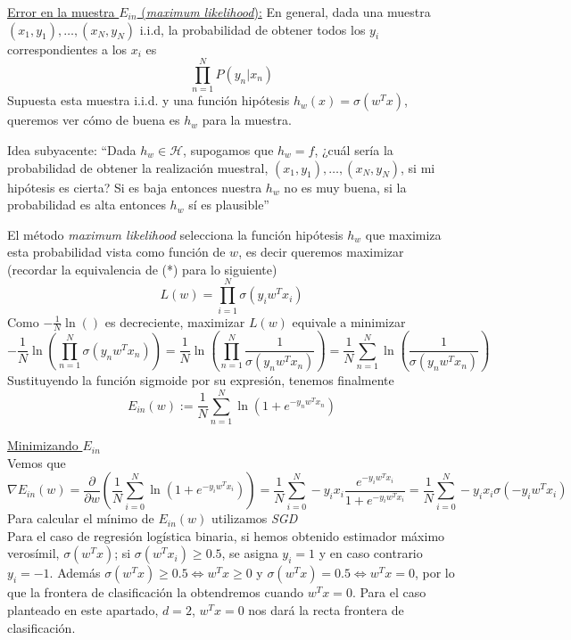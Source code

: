 \documentclass[11pt,a4paper]{article}
\theoremstyle{definition}
\begin{document}
	\underline{Error en la muestra $E_{in}$ (\textit{maximum likelihood}):} En general, dada una muestra $(x_1,y_1),\ldots,(x_N, y_N)$ i.i.d, la probabilidad de obtener todos los $y_i$ correspondientes a los $x_i$ es
		$$\prod_{n=1}^N P(y_n | x_n)$$ 
		Supuesta esta muestra i.i.d. y una función hipótesis $h_w(x)=\sigma(w^Tx)$, queremos ver cómo de buena es $h_w$ para la muestra.
		
		Idea subyacente: ``Dada $h_w \in \mathcal H$, supogamos que $h_w=f$, ¿cuál sería la probabilidad de obtener la realización muestral, $(x_1,y_1),\ldots,(x_N, y_N)$, si mi hipótesis es cierta? Si es baja entonces nuestra $h_w$ no es muy buena, si la probabilidad es alta entonces $h_w$ sí es plausible''
		
		El método \textit{maximum likelihood} selecciona la función hipótesis $h_w$ que maximiza esta probabilidad vista como función de $w$, es decir queremos maximizar (recordar la equivalencia de (*) para lo siguiente)
	$$L(w)\iffalse=\prod_{i=1}^N P(y_i|x_i)\fi=\prod_{i=1}^N \sigma (y_i w^T x_i) $$
	Como $-\frac{1}{N} \ln()$ es decreciente, maximizar $L(w)$ equivale a minimizar 
		$$-\frac{1}{N} \ln\left( \prod_{n=1}^N \sigma(y_n w^T x_n)\right)=\frac{1}{N} \ln\left( \prod_{n=1}^N \frac{1}{\sigma(y_n w^T x_n)}\right)=\frac{1}{N}  \sum_{n=1}^N \ln \left( \frac{1}{\sigma(y_n w^T x_n)} \right)$$
		Sustituyendo la función sigmoide por su expresión, tenemos finalmente
		$$E_{in}(w):=\frac{1}{N} \sum_{n=1}^N \ln \left(1+e^{-y_nw^Tx_n}\right)$$
		
	\underline{Minimizando $E_{in}$}\\
	Vemos que 
	$$\nabla E_{in}(w)=\frac{\partial}{\partial w} \left( \frac{1}{N} \sum_{i=0}^N \ln (1+e^{-y_i w^T x_i})\right)=\frac{1}{N}\sum_{i=0}^N -y_ix_i \frac{e^{-y_i w^T x_i}}{1+e^{-y_iw^Tx_i}}=\frac{1}{N}\sum_{i=0}^N -y_ix_i\sigma(-y_iw^Tx_i)$$
	Para calcular el mínimo de $E_{in}(w)$ utilizamos \textit{SGD}\\
	
	Para el caso de regresión logística binaria, si hemos obtenido estimador máximo verosímil, $\sigma(w^Tx)$; si $ \sigma(w^Tx_i)\geq 0.5$, se asigna $y_i=1$ y en caso contrario $y_i=-1$. Además $\sigma(w^Tx)\geq 0.5 \Leftrightarrow w^Tx\geq 0$ y $\sigma(w^Tx)=0.5 \Leftrightarrow w^Tx= 0$, por lo que la frontera de clasificación la obtendremos cuando $w^Tx=0$. Para el caso planteado en este apartado, $d=2$,  $w^Tx=0$ nos dará la recta frontera de clasificación.\\
	
\end{document}
